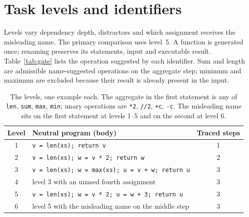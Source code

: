\documentclass[11pt]{article}
\begin{document}


\appendix

\section{Task levels and identifiers}
\label{app:levels}

Levels vary dependency depth, distractors and which assignment receives the misleading name.
The primary comparison uses level~5. A function is generated once; renaming preserves its
statements, input and executable result. Table~\ref{tab:gate} lists the operation suggested by
each identifier. Sum and length are admissible name-suggested operations on the aggregate step; minimum
and maximum are excluded because their result is already present in the input.


\begin{table}[t]
\centering\small
\begin{tabular}{@{}clc@{}}
\toprule
Level & Neutral program (body) & Traced steps \\
\midrule
1 & \texttt{v = len(xs); return v} & 1 \\
2 & \texttt{v = len(xs); w = v * 2; return w} & 2 \\
3 & \texttt{v = len(xs); w = max(xs); u = v + w; return u} & 3 \\
4 & level 3 with an unused fourth assignment & 3 \\
5 & \texttt{v = len(xs); w = v * 2; u = w + 3; return u} & 3 \\
6 & level 5 with the misleading name on the middle step & 3 \\
\bottomrule
\end{tabular}
\caption{The levels, one example each. The aggregate in the first statement is any of
\texttt{len}, \texttt{sum}, \texttt{max}, \texttt{min}; unary operations are \texttt{*2},
\texttt{//2}, \texttt{+c}, \texttt{-c}. The misleading name sits on the first statement at
levels 1--5 and on the second at level 6.}
\label{tab:levels}
\end{table}
\end{document}
